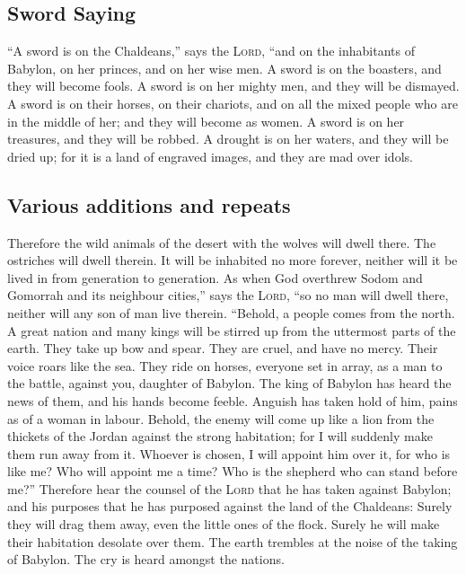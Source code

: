 \hypertarget{sword-saying}{%
\subsection{Sword Saying}\label{sword-saying}}

 ``A sword is on the Chaldeans,'' says the \textsc{Lord},
``and on the inhabitants of Babylon, on her princes, and on her wise
men.  A sword is on the boasters, and they will become
fools. A sword is on her mighty men, and they will be dismayed.
 A sword is on their horses, on their chariots, and on
all the mixed people who are in the middle of her; and they will become
as women. A sword is on her treasures, and they will be robbed.
 A drought is on her waters, and they will be dried up;
for it is a land of engraved images, and they are mad over idols.

\hypertarget{various-additions-and-repeats}{%
\subsection{Various additions and
repeats}\label{various-additions-and-repeats}}

 Therefore the wild animals of the desert with the wolves
will dwell there. The ostriches will dwell therein. It will be inhabited
no more forever, neither will it be lived in from generation to
generation.  As when God overthrew Sodom and Gomorrah and
its neighbour cities,'' says the \textsc{Lord}, ``so no man will dwell
there, neither will any son of man live therein. 
``Behold, a people comes from the north. A great nation and many kings
will be stirred up from the uttermost parts of the earth.
 They take up bow and spear. They are cruel, and have no
mercy. Their voice roars like the sea. They ride on horses, everyone set
in array, as a man to the battle, against you, daughter of Babylon.
 The king of Babylon has heard the news of them, and his
hands become feeble. Anguish has taken hold of him, pains as of a woman
in labour.  Behold, the enemy will come up like a lion
from the thickets of the Jordan against the strong habitation; for I
will suddenly make them run away from it. Whoever is chosen, I will
appoint him over it, for who is like me? Who will appoint me a time? Who
is the shepherd who can stand before me?''  Therefore
hear the counsel of the \textsc{Lord} that he has taken against Babylon;
and his purposes that he has purposed against the land of the Chaldeans:
Surely they will drag them away, even the little ones of the flock.
Surely he will make their habitation desolate over them. 
The earth trembles at the noise of the taking of Babylon. The cry is
heard amongst the nations.

